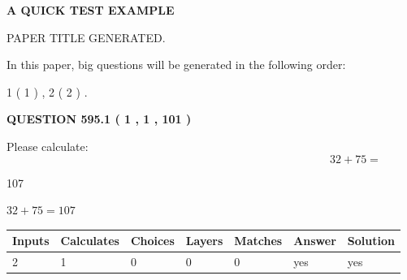 \documentclass[12pt]{article}
\begin{document}
   
   
   
   
   
 \vspace{0.2in}
{\LARGE {\textbf{ A QUICK TEST EXAMPLE}}}
   
   
 PAPER TITLE GENERATED.
   
   
   
\vspace{0.2in}
   
In this paper, big questions will be generated in the following order: 
   
   
   1 ( 1 )
 ,
   2 ( 2 )
 .
  
\vspace{0.2in}
  
{\textbf{\Large{QUESTION
595.1 
 ( 1 , 1 , 101 )
}}}
  
  
 
Please calculate:
\begin{equation}
32 +  %
75 = \nonumber
\end{equation}
 
 
 
\noindent{}
 
 

107
 
 
\noindent{}
 
 

 
 
 
\noindent{}
 
 

$ %
32 +  %
75=   %
107$
 
 
\noindent{}
 
 

 
   
   
   
   
\noindent\begin{tabular}{|l|l|l|l|l|l|l|}
 \hline
Inputs & Calculates & Choices & Layers & Matches & Answer & Solution \\ \hline
 2  & 
 1  & 
 0
  & 
 0  & 
 0  & 
  yes & 
  yes 
  \\ \hline
 \end{tabular}
   
   
   
\end{document}
